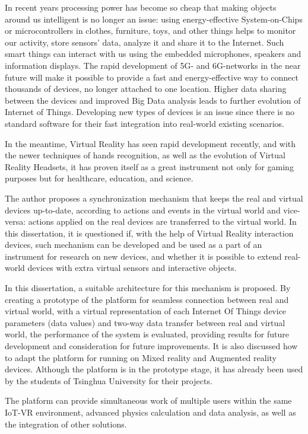 \begin{abstract*}

  In recent years processing power has become so cheap that making objects around us intelligent is no longer an issue: using energy-effective System-on-Chips or microcontrollers in clothes, furniture, toys, and other things helps to monitor our activity, store sensors' data, analyze it and share it to the Internet. Such smart things can interact with us using the embedded microphones, speakers and information displays. The rapid development of 5G- and 6G-networks in the near future will make it possible to provide a fast and energy-effective way to connect thousands of devices, no longer attached to one location. Higher data sharing between the devices and improved Big Data analysis leads to further evolution of Internet of Things. Developing new types of devices is an issue since there is no standard software for  their fast integration into real-world existing scenarios.
   
  In the meantime, Virtual Reality has seen rapid development recently, and with the newer techniques of hands recognition, as well as the evolution of Virtual Reality Headsets, it has proven itself as a great instrument not only for gaming purposes but for healthcare, education, and science.
   
  The author proposes a synchronization mechanism that keeps the real and virtual devices up-to-date, according to actions and events in the virtual world and vice-versa: actions applied on the real devices are transferred to the virtual world. In this dissertation, it is questioned if, with the help of Virtual Reality interaction devices, such mechanism can be developed and be used as a part of an instrument for research on new devices, and whether it is possible to extend real-world devices with extra virtual sensors and interactive objects.
  
  In this dissertation, a suitable architecture for this mechanism is proposed. By creating a prototype of the platform for seamless connection between real and virtual world, with a virtual representation of each Internet Of Things device parameters (data values) and two-way data transfer between real and virtual world, the performance of the system is evaluated, providing results for future development and consideration for future improvements. It is also discussed how to adapt the platform for running on Mixed reality and Augmented reality devices. Although the platform is in the prototype stage, it has already been used by the students of Tsinghua University for their projects. 
  
  The platform can provide simultaneous work of multiple users within the same IoT-VR environment, advanced physics calculation and data analysis, as well as the integration of other solutions.
 


\end{abstract*}
